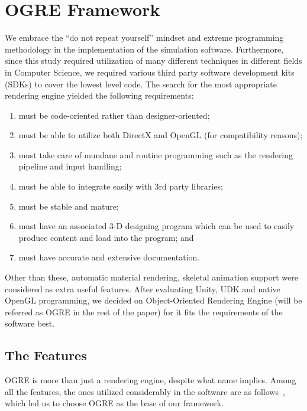 \appendix
\chapter{OGRE Framework}
\label{appendix_ogre_framework}

We embrace the ``do not repeat yourself'' mindset and extreme programming methodology in the implementation of the simulation software. Furthermore, since this study required utilization of many different techniques in different fields in Computer Science, we required various third party software development kits (SDKs) to cover the lowest level code. The search for the most appropriate rendering engine yielded the following requirements:

\begin{enumerate}
\item must be code-oriented rather than designer-oriented;
\item must be able to utilize both DirectX and OpenGL (for compatibility reasons);
\item must take care of mundane and routine programming such as the rendering pipeline and input handling;
\item must be able to integrate easily with 3rd party libraries;
\item must be stable and mature;
\item must have an associated 3-D designing program which can be used to easily produce content and load into the program; and
\item must have accurate and extensive documentation.
\end{enumerate}

Other than these, automatic material rendering, skeletal animation support were considered as extra useful features. After evaluating Unity, UDK and native OpenGL programming, we decided on Object-Oriented Rendering Engine (will be referred as OGRE in the rest of the paper) for it fits the requirements of the software best.


\section{The Features}
OGRE is more than just a rendering engine, despite what name implies. Among all the features, the ones utilized considerably in the software are as follows~\cite{Knot2012}, which led us to choose OGRE as the base of our framework.

